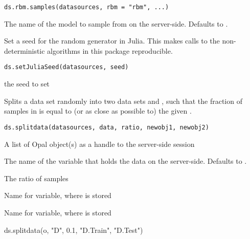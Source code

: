%
\begin{Usage}
\begin{verbatim}
ds.rbm.samples(datasources, rbm = "rbm", ...)
\end{verbatim}
\end{Usage}
%
\begin{Arguments}
\begin{ldescription}
\item[\code{rbm}] The name of the model to sample from on the server-side. Defaults to .
\end{ldescription}
\end{Arguments}
%
\begin{Description}\relax
Set a seed for the random generator in Julia.
This makes calls to the non-deterministic algorithms in this package reproducible.
\end{Description}
%
\begin{Usage}
\begin{verbatim}
ds.setJuliaSeed(datasources, seed)
\end{verbatim}
\end{Usage}
%
\begin{Arguments}
\begin{ldescription}
\item[\code{seed}] the seed to set
\end{ldescription}
\end{Arguments}
%
\begin{Description}\relax
Splits a data set randomly into two data sets  and , such that
the fraction of samples in  is equal to (or as close as possible to) the
given .
\end{Description}
%
\begin{Usage}
\begin{verbatim}
ds.splitdata(datasources, data, ratio, newobj1, newobj2)
\end{verbatim}
\end{Usage}
%
\begin{Arguments}
\begin{ldescription}
\item[\code{datasources}] A list of Opal object(s) as a handle to the server-side session

\item[\code{data}] The name of the variable that holds the data on the server-side. Defaults to .

\item[\code{ratio}] The ratio of samples

\item[\code{newobj1}] Name for variable, where  is stored

\item[\code{newobj2}] Name for variable, where  is stored
\end{ldescription}
\end{Arguments}
%
\begin{Examples}
\begin{ExampleCode}
    ds.splitdata(o, "D", 0.1, "D.Train", "D.Test")
\end{ExampleCode}
\end{Examples}
